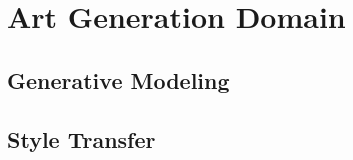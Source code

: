 
\chapter{Art Generation Domain } \label{ch-2}
 
\begin{large}


\end{large}

\section{ Generative Modeling}
\begin{large}


\end{large}

\section{ Style Transfer }
\begin{large}


\end{large}
